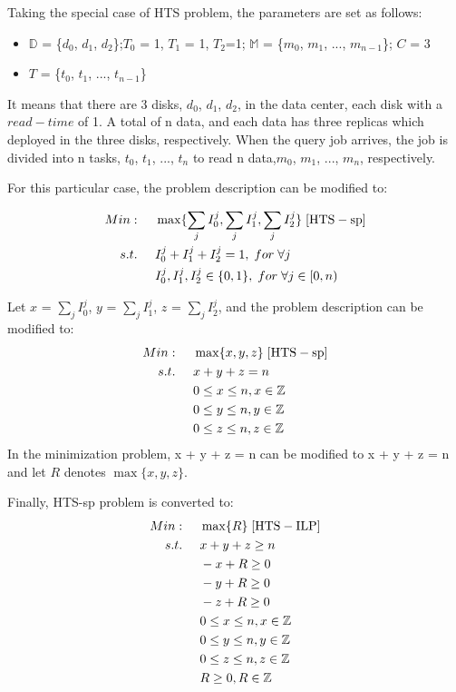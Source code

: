 \documentclass[conference]{IEEEtran}
\begin{document}
Taking the special case of HTS problem, the parameters are set as follows:
\begin{itemize}
	\item $\mathbb{D}$ = \{$d_0$, $d_1$, $d_2$\};$T_0$ = 1, $T_1$ = 1, $T_2$=1; $\mathbb{M}$ = \{$m_0$, $m_1$, ..., $m_{n-1}$\}; $C$ = 3
	\item $T$ = \{$t_0$, $t_1$, ..., $t_{n-1}$\}
\end{itemize}

It means that there are 3 disks, $d_0$, $d_1$, $d_2$, in the data center, each disk with a $read-time$ of 1. A total of n data, and each data has three replicas which deployed in the three disks, respectively. When the query job arrives, the job is divided into n tasks, $t_0$, $t_1$, ..., $t_n$ to read n data,$m_0$, $m_1$, ..., $m_n$, respectively.

For this particular case, the problem description can be modified to:

\begin{align}
Min:&\;\;\;\;\;\max\{\sum_{j}I_0^j, \sum_{j}I_1^j, \sum_{j}I_2^j\}\;[\rm{HTS-sp}]\\
s.t. 
&\;\;\;\;\;I_0^j + I_1^j +I_2^j= 1,\;for\;\forall j\nonumber\\
&\;\;\;\;\;I_0^j, I_1^j, I_2^j\in\{0,1\},\;for\;\forall j \in[0,n)\nonumber
\end{align}

Let  $x$ = $\sum_{j}I_0^j$, $y$ = $\sum_{j}I_1^j$, $z$ = $\sum_{j}I_2^j$, and the problem description can be modified to:
\begin{align}
Min:&\;\;\;\;\;\max\{x,y,z\}\;[\rm{HTS-sp}]\\
s.t. 
&\;\;\;\;\;x + y + z = n\;\label{enlarge-cons}\\
&\;\;\;\;\;0 \leq x \leq n, x\in\mathbb{Z}\nonumber\\
&\;\;\;\;\;0 \leq y \leq n, y\in\mathbb{Z}\nonumber\\
&\;\;\;\;\;0 \leq z \leq n, z\in\mathbb{Z}\nonumber
\end{align}
In the minimization problem, x + y + z = n can be modified to x + y + z = n and let $R$ denotes $\max\{x,y,z\}$. 

Finally, HTS-sp problem is converted to:
\begin{align}
Min:&\;\;\;\;\;\max\{R\}\;[\rm{HTS-ILP}]\label{HTS-ILP}\\
s.t. 
&\;\;\;\;\;x + y + z \geq n\;\nonumber\\
&\;\;\;\;\;-x + R \geq 0 \nonumber\\
&\;\;\;\;\;-y + R \geq 0  \nonumber\\
&\;\;\;\;\;-z + R \geq 0 \nonumber\\
&\;\;\;\;\;0 \leq x \leq n, x\in\mathbb{Z}\nonumber\\
&\;\;\;\;\;0 \leq y \leq n, y\in\mathbb{Z}\nonumber\\
&\;\;\;\;\;0 \leq z \leq n, z\in\mathbb{Z}\nonumber\\
&\;\;\;\;\;R \geq 0, R\in\mathbb{Z}\nonumber
\end{align}
\end{document}
